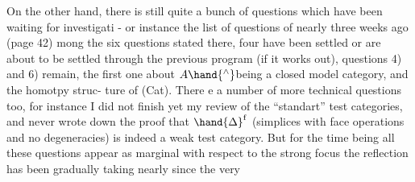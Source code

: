 On the other hand,  there is still quite a bunch of questions which
have been waiting for investigati - or instance the list of questions
of nearly three weeks ago (page 42) mong the six questions stated
there,  four have been settled\hand{,} or are about to be settled through the
previous program (if it works out),  questions 4) and 6) remain,  the
first one  about $A\hand{^\wedge}$\hand{/}being a closed model category,  and  the homotpy struc-%
ture of (Cat).  There e a number of more technical questions too,  for
instance I did not finish yet my review of the ``standart'' test categories,
and never wrote down the proof that $\hand{\Delta}^{\mathrm{f}}$ (simplices with face operations
and no degeneracies)  is indeed a weak test category.  But for the time
being all these questions appear as  marginal with respect to the strong
focus the reflection has been gradually taking nearly since the very

